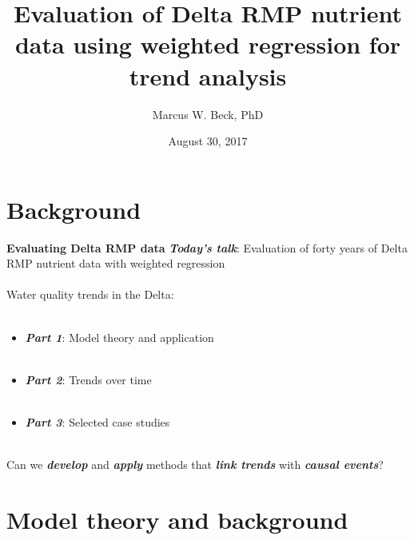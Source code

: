 \documentclass[serif]{beamer}\usepackage[]{graphicx}\usepackage[]{color}
\newcommand{\emtxt}[1]{\textbf{\textit{#1}}}
\begin{document}
\title[Evaluation of Delta RMP data]{\textbf{Evaluation of Delta RMP nutrient data using weighted regression for trend analysis}}
\author[M. Beck]{Marcus W. Beck, PhD}


\date{August 30, 2017}


\begin{frame}[shrink]
\vspace{0.2in}
\titlepage
\end{frame}

\section{Background}

\begin{frame}{\textbf{Evaluating Delta RMP data}}{}
\onslide<+->
\emtxt{Today's talk}: Evaluation of forty years of Delta RMP nutrient data with weighted regression \\~\\
\onslide<+->
Water quality trends in the Delta: \\~\\
\begin{itemize}
\item \emtxt{Part 1}: Model theory and application \\~\\
\item \emtxt{Part 2}: Trends over time \\~\\
\item \emtxt{Part 3}: Selected case studies \\~\\
\end{itemize}
\onslide<+->
Can we \emtxt{develop} and \emtxt{apply} methods that \emtxt{link trends} with \emtxt{causal events}?
\end{frame}

\section{Model theory and background}
\end{document}
